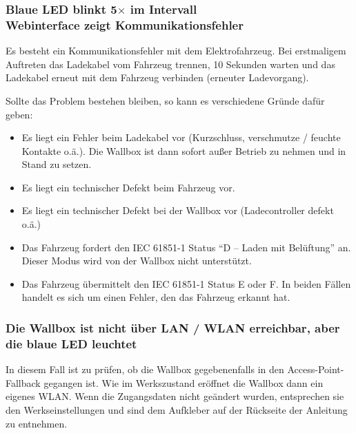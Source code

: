 \documentclass[a4paper,10pt]{article}
\begin{document}
\begin{multicols*}{2}
	\subsubsection*{Blaue LED blinkt 5$\times$ im Intervall \\ Webinterface zeigt Kommunikationsfehler}
	Es besteht ein Kommunikationsfehler mit dem Elektrofahrzeug. Bei erstmaligem
	Auftreten das Ladekabel vom Fahrzeug trennen, 10 Sekunden warten und das
	Ladekabel erneut mit dem Fahrzeug verbinden (erneuter Ladevorgang).

	Sollte das Problem bestehen bleiben, so kann es verschiedene Gründe dafür
	geben:
	\begin{itemize}
		\item Es liegt ein Fehler beim Ladekabel vor (Kurzschluss, verschmutze / feuchte
		      Kontakte o.ä.). Die Wallbox ist dann sofort außer Betrieb zu nehmen und
		      in Stand zu setzen.
		\item Es liegt ein technischer Defekt beim Fahrzeug vor.
		\item Es liegt ein technischer Defekt bei der Wallbox vor (Ladecontroller defekt o.ä.)
		\item Das Fahrzeug fordert den IEC 61851-1 Status \enquote{D – Laden mit Belüftung}
		      an. Dieser Modus wird von der Wallbox nicht unterstützt.
		\item Das Fahrzeug übermittelt den IEC 61851-1 Status E oder F. In beiden Fällen
		      handelt es sich um einen Fehler, den das Fahrzeug erkannt hat.
	\end{itemize}

	\subsubsection*{Die Wallbox ist nicht über LAN / WLAN erreichbar, aber die blaue LED leuchtet}
	In diesem Fall ist zu prüfen, ob die Wallbox gegebenenfalls in den Access-Point-Fallback
	gegangen ist. Wie im Werkszustand eröffnet die Wallbox dann ein eigenes
	WLAN. Wenn die Zugangsdaten nicht geändert wurden, entsprechen sie den Werkseinstellungen und sind dem
	Aufkleber auf der Rückseite der Anleitung zu entnehmen.


\end{multicols*}
\end{document}
